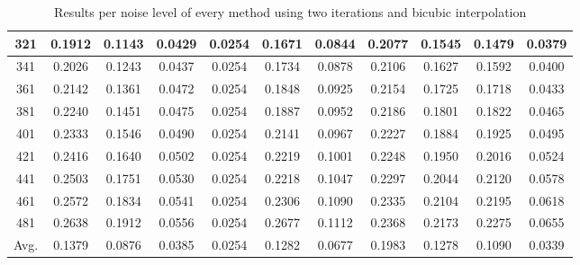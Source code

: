 \begin{table}[ht!]
\begin{tabular}{c|c|c|c|c|c|c|c|c|c|c}
321 & 0.1912 & 0.1143 & 0.0429 & 0.0254 & 0.1671 & 0.0844 & 0.2077 & 0.1545 & 0.1479 & 0.0379 \\ \hline
341 & 0.2026 & 0.1243 & 0.0437 & 0.0254 & 0.1734 & 0.0878 & 0.2106 & 0.1627 & 0.1592 & 0.0400 \\ \hline
361 & 0.2142 & 0.1361 & 0.0472 & 0.0254 & 0.1848 & 0.0925 & 0.2154 & 0.1725 & 0.1718 & 0.0433 \\ \hline
381 & 0.2240 & 0.1451 & 0.0475 & 0.0254 & 0.1887 & 0.0952 & 0.2186 & 0.1801 & 0.1822 & 0.0465 \\ \hline
401 & 0.2333 & 0.1546 & 0.0490 & 0.0254 & 0.2141 & 0.0967 & 0.2227 & 0.1884 & 0.1925 & 0.0495 \\ \hline
421 & 0.2416 & 0.1640 & 0.0502 & 0.0254 & 0.2219 & 0.1001 & 0.2248 & 0.1950 & 0.2016 & 0.0524 \\ \hline
441 & 0.2503 & 0.1751 & 0.0530 & 0.0254 & 0.2218 & 0.1047 & 0.2297 & 0.2044 & 0.2120 & 0.0578 \\ \hline
461 & 0.2572 & 0.1834 & 0.0541 & 0.0254 & 0.2306 & 0.1090 & 0.2335 & 0.2104 & 0.2195 & 0.0618 \\ \hline
481 & 0.2638 & 0.1912 & 0.0556 & 0.0254 & 0.2677 & 0.1112 & 0.2368 & 0.2173 & 0.2275 & 0.0655 \\ \hline
Avg.  & 0.1379 & 0.0876 & 0.0385 & 0.0254 & 0.1282 & 0.0677 & 0.1983 & 0.1278 & 0.1090 & 0.0339 \\ \hline
\end{tabular}
\caption{Results per noise level of every method using two iterations and bicubic interpolation}
\label{tab:2itCperNoise}
\end{table}


